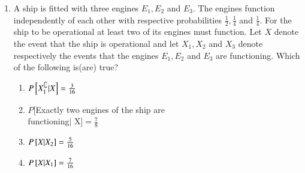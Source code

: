 \documentclass[journal,12pt,twocolumn,article]{IEEEtran}
\theoremstyle{remark}
\begin{document}
\begin{enumerate}[start = 3]
\hfill{}
\begin{enumerate}
\end{enumerate}
\item A ship is fitted with three engines $E_1,E_2$ and $E_3$. The engines function independently of each other with respective probabilities $\frac{1}{2},\frac{1}{4}$ and $\frac{1}{4}$. For the ship to be operational at least two of its engines must function. Let $X$ denote the event that the ship is operational and let $X_1,X_2$ and $X_3$ denote respectively the events that the engines $E_1,E_2$ and $E_3$ are functioning. Which of the following is(are) true?
\hfill{}
\begin{enumerate}
\item $P{}\left[X_1^\complement|X\right]=\frac{3}{16}$
\item $P$[Exactly two engines of the ship are \\functioning\;$|$\; X]$=\frac{7}{8}$
\item $P{}\left[X|X_2\right]=\frac{5}{16}$
\item $P{}\left[X|X_1\right]=\frac{7}{16}$
\end{enumerate}
\end{enumerate}
\end{document}
